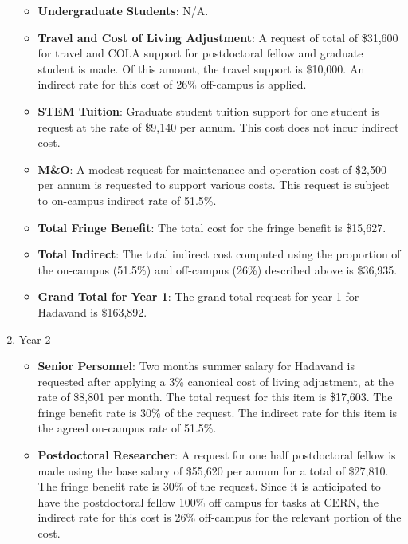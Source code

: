 \begin{enumerate}
\begin{itemize}
\item {{\bf Undergraduate Students}: N/A.}

\item{{\bf Travel and Cost of Living Adjustment}: A request of total of \$31,600 for travel and COLA support for postdoctoral fellow and graduate student is made. Of this amount, the travel support is \$10,000.  An indirect rate for this cost of 26\% off-campus is applied. }

\item {{\bf STEM Tuition}: Graduate student tuition support for one student is request at the rate of \$9,140 per annum.  This cost does not incur indirect cost.}

\item {{\bf M\&O}: A modest request for maintenance and operation cost of \$2,500 per annum is requested to support various costs.   This request is subject to on-campus indirect rate of 51.5\%.}

\item {{\bf Total Fringe Benefit}: The total cost for the fringe benefit is \$15,627.}

\item {{\bf Total Indirect}: The total indirect cost computed using the proportion of the on-campus (51.5\%) and off-campus (26\%) described above is \$36,935.}

\item {{\bf Grand Total for Year 1}: The grand total request for year 1 for Hadavand is \$163,892.}

\end{itemize}

\item{Year 2}
\begin{itemize}
\item{{\bf Senior Personnel}: Two months summer salary for Hadavand is requested after applying a 3\% canonical cost of living adjustment, at the rate of \$8,801 per month.  The total request for this item is \$17,603.   The fringe benefit rate is 30\% of the request.  The indirect rate for this item is the agreed on-campus rate of 51.5\%.}

\item {{\bf Postdoctoral Researcher}:  A request for one half postdoctoral fellow is made using the base salary of \$55,620 per annum for a total of \$27,810.  The fringe benefit rate is 30\% of the request.  Since it is anticipated to have the postdoctoral fellow 100\% off campus for tasks at CERN, the indirect rate for this cost is 26\% off-campus for the relevant portion of the cost.} 


\end{itemize}
\end{enumerate}

